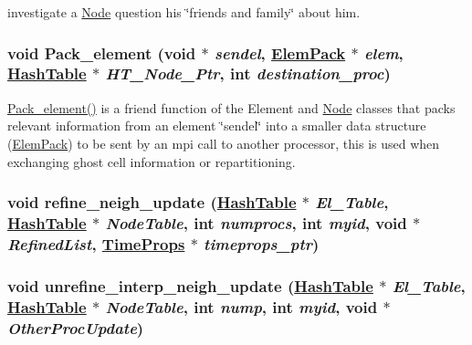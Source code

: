 investigate a \hyperlink{classNode}{Node} question his \char`\"{}friends and family\char`\"{} about him. 

\hypertarget{classElement_n10}{
\subsubsection[Pack\_\-element]{\setlength{\rightskip}{0pt plus 5cm}void Pack\_\-element (void $\ast$ {\em sendel}, \hyperlink{structElemPack}{Elem\-Pack} $\ast$ {\em elem}, \hyperlink{classHashTable}{Hash\-Table} $\ast$ {\em HT\_\-Node\_\-Ptr}, int {\em destination\_\-proc})}}
\label{classElement_n10}


\hyperlink{classElement_n10}{Pack\_\-element()} is a friend function of the Element and \hyperlink{classNode}{Node} classes that packs relevant information from an element \char`\"{}sendel\char`\"{} into a smaller data structure (\hyperlink{structElemPack}{Elem\-Pack}) to be sent by an mpi call to another processor, this is used when exchanging ghost cell information or repartitioning. 

\hypertarget{classElement_n6}{
\subsubsection[refine\_\-neigh\_\-update]{\setlength{\rightskip}{0pt plus 5cm}void refine\_\-neigh\_\-update (\hyperlink{classHashTable}{Hash\-Table} $\ast$ {\em El\_\-Table}, \hyperlink{classHashTable}{Hash\-Table} $\ast$ {\em Node\-Table}, int {\em numprocs}, int {\em myid}, void $\ast$ {\em Refined\-List}, \hyperlink{structTimeProps}{Time\-Props} $\ast$ {\em timeprops\_\-ptr})}}
\label{classElement_n6}


\hypertarget{classElement_n8}{
\subsubsection[unrefine\_\-interp\_\-neigh\_\-update]{\setlength{\rightskip}{0pt plus 5cm}void unrefine\_\-interp\_\-neigh\_\-update (\hyperlink{classHashTable}{Hash\-Table} $\ast$ {\em El\_\-Table}, \hyperlink{classHashTable}{Hash\-Table} $\ast$ {\em Node\-Table}, int {\em nump}, int {\em myid}, void $\ast$ {\em Other\-Proc\-Update})}}
\label{classElement_n8}


